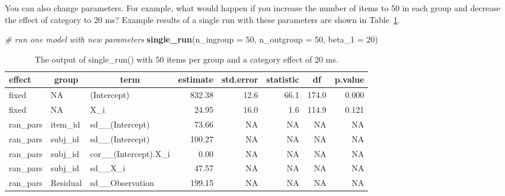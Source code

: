 \documentclass[
  english,
  doc,floatsintext]{apa6}
\newenvironment{Shaded}{\begin{snugshade}}{\end{snugshade}}
\newcommand{\CommentTok}[1]{\textcolor[rgb]{0.56,0.35,0.01}{\textit{#1}}}
\newcommand{\DataTypeTok}[1]{\textcolor[rgb]{0.13,0.29,0.53}{#1}}
\newcommand{\DecValTok}[1]{\textcolor[rgb]{0.00,0.00,0.81}{#1}}
\newcommand{\KeywordTok}[1]{\textcolor[rgb]{0.13,0.29,0.53}{\textbf{#1}}}
\newcommand{\NormalTok}[1]{#1}
\begin{document}
You can also change parameters. For example, what would happen if you increase the number of items to 50 in each group and decrease the effect of category to 20 ms? Example results of a single run with these parameters are shown in Table~\ref{tab:singrun-new}.

\begin{Shaded}
\begin{Highlighting}[]
\CommentTok{# run one model with new parameters}
\KeywordTok{single_run}\NormalTok{(}\DataTypeTok{n_ingroup =} \DecValTok{50}\NormalTok{, }\DataTypeTok{n_outgroup =} \DecValTok{50}\NormalTok{, }\DataTypeTok{beta_1 =} \DecValTok{20}\NormalTok{)}
\end{Highlighting}
\end{Shaded}

\begin{table}[H]

\begin{center}
\begin{threeparttable}

\caption{\label{tab:singrun-new}The output of single\_run() with 50 items per group and a category effect of 20 ms.}

\small{

\begin{tabular}{lllrrrrr}
\toprule
effect & \multicolumn{1}{c}{group} & \multicolumn{1}{c}{term} & \multicolumn{1}{c}{estimate} & \multicolumn{1}{c}{std.error} & \multicolumn{1}{c}{statistic} & \multicolumn{1}{c}{df} & \multicolumn{1}{c}{p.value}\\
\midrule
fixed & NA & (Intercept) & 832.38 & 12.6 & 66.1 & 174.0 & 0.000\\
fixed & NA & X\_i & 24.95 & 16.0 & 1.6 & 114.9 & 0.121\\
ran\_pars & item\_id & sd\_\_(Intercept) & 73.66 & NA & NA & NA & NA\\
ran\_pars & subj\_id & sd\_\_(Intercept) & 100.27 & NA & NA & NA & NA\\
ran\_pars & subj\_id & cor\_\_(Intercept).X\_i & 0.00 & NA & NA & NA & NA\\
ran\_pars & subj\_id & sd\_\_X\_i & 47.57 & NA & NA & NA & NA\\
ran\_pars & Residual & sd\_\_Observation & 199.15 & NA & NA & NA & NA\\
\bottomrule
\end{tabular}

}

\end{threeparttable}
\end{center}

\end{table}
\end{document}
